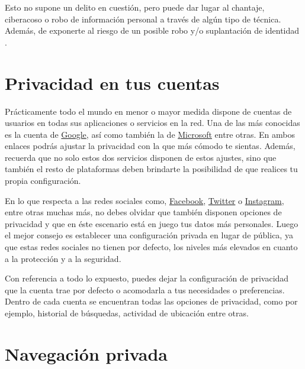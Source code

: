 \documentclass[
  a4paper,
  openany]{book}
\begin{document}
Esto no supone un delito en cuestión, pero puede dar lugar al chantaje, ciberacoso o robo de información personal a través de algún tipo de técnica. Además, de exponerte al riesgo de un posible robo y/o suplantación de identidad \citep{AEPD-oversharing}.

\hypertarget{privacidad-en-tus-cuentas}{%
\section{Privacidad en tus cuentas}\label{privacidad-en-tus-cuentas}}

Prácticamente todo el mundo en menor o mayor medida dispone de cuentas de usuarios en todas sus aplicaciones o servicios en la red. Una de las más conocidas es la cuenta de \href{https://myaccount.google.com/data-and-personalization}{Google}, así como también la de \href{https://account.microsoft.com/account/privacy}{Microsoft} entre otras. En ambos enlaces podrás ajustar la privacidad con la que más cómodo te sientas. Además, recuerda que no solo estos dos servicios disponen de estos ajustes, sino que también el resto de plataformas deben brindarte la posibilidad de que realices tu propia configuración.

En lo que respecta a las redes sociales como, \href{https://es-la.facebook.com/help/325807937506242}{Facebook}, \href{https://help.twitter.com/es/safety-and-security\#ads-and-data-privacy}{Twitter} o \href{https://es-es.facebook.com/help/instagram/196883487377501/?helpref=hc_fnav\&bc\%5B0\%5D=Ayuda\%20de\%20Instagram\&bc\%5B1\%5D=Administrar\%20tu\%20cuenta}{Instagram}, entre otras muchas más, no debes olvidar que también disponen opciones de privacidad y que en éste escenario está en juego tus datos más personales. Luego el mejor consejo es establecer una configuración privada en lugar de pública, ya que estas redes sociales no tienen por defecto, los niveles más elevados en cuanto a la protección y a la seguridad.

Con referencia a todo lo expuesto, puedes dejar la configuración de privacidad que la cuenta trae por defecto o acomodarla a tus necesidades o preferencias. Dentro de cada cuenta se encuentran todas las opciones de privacidad, como por ejemplo, historial de búsquedas, actividad de ubicación entre otras.

\hypertarget{navegaciuxf3n-privada}{%
\section{Navegación privada}\label{navegaciuxf3n-privada}}
\end{document}
